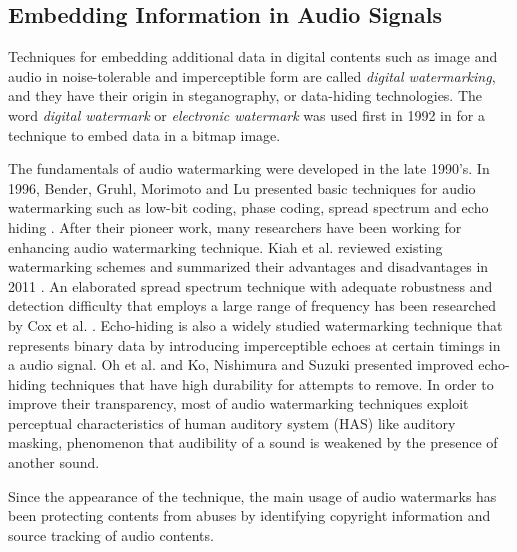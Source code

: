 \subsection{Embedding Information in Audio Signals}
Techniques for embedding additional data in digital contents such as image and audio in noise-tolerable and imperceptible form are called {\it digital watermarking}, and they have their origin in steganography, or data-hiding technologies.
The word {\it digital watermark} or {\it electronic watermark} was used first in 1992 in \cite{tirkel1993electronic} for a technique to embed data in a bitmap image.

The fundamentals of audio watermarking were developed in the late 1990's.
In 1996, Bender, Gruhl, Morimoto and Lu presented basic techniques for audio watermarking such as low-bit coding, phase coding, spread spectrum and echo hiding \cite{bender1996techniques}.
After their pioneer work, many researchers have been working for enhancing audio watermarking technique.
Kiah et al. reviewed existing watermarking schemes and summarized their advantages and disadvantages in 2011 \cite{mat2011review}.
An elaborated spread spectrum technique with adequate robustness and detection difficulty that employs a large range of frequency has been researched by Cox et al. \cite{cox1997secure,cox2001digital}.
Echo-hiding is also a widely studied watermarking technique that represents binary data by introducing imperceptible echoes at certain timings in a audio signal. Oh et al. \cite{oh2001new} and Ko, Nishimura and Suzuki \cite{ko2005time} presented improved echo-hiding techniques that have high durability for attempts to remove.
In order to improve their transparency, most of audio watermarking techniques exploit perceptual characteristics of human auditory system (HAS) like auditory masking, phenomenon that audibility of a sound is weakened by the presence of another sound.

Since the appearance of the technique, the main usage of audio watermarks has been
protecting contents from abuses by identifying copyright information and source tracking of audio contents.

